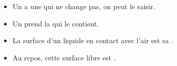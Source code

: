 \begin{mybilan}
	\begin{itemize}
		\item Un  a une  qui ne change pas, on peut le saisir.
		\item Un  prend la  qui le contient.
		\item La surface d'un liquide en contact avec l'air est sa .
		\item Au repos, cette surface libre est .
	\end{itemize}	   
\end{mybilan}